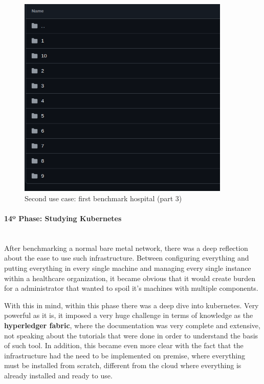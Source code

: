 \begin{figure}[H]
    \centering
    \includegraphics[width=0.9\textwidth]{assets/use-case-2/first-benchmarking-hospital3.png} %
    \caption{Second use case: first benchmark hospital (part 3)}
    \label{fig:sample-image} 
\end{figure}
\paragraph{14º Phase: Studying Kubernetes}\mbox{}\\
After benchmarking a normal bare metal network, there was a deep reflection about the ease to use such infrastructure. Between configuring everything and putting everything in every single machine and managing every single instance within a healthcare organization, it became obvious that it would create burden for a administrator that wanted to spoil it's machines with multiple components. 

With this in mind, within this phase there was a deep dive into kubernetes. Very powerful as it is, it imposed a very huge challenge in terms of knowledge as the \textbf{hyperledger fabric}, where the documentation was very complete and extensive, not speaking about the tutorials that were done in order to understand the basis of such tool. In addition, this became even more clear with the fact that the infrastructure had the need to be implemented on premise, where everything must be installed from scratch, different from the cloud where everything is already installed and ready to use.


